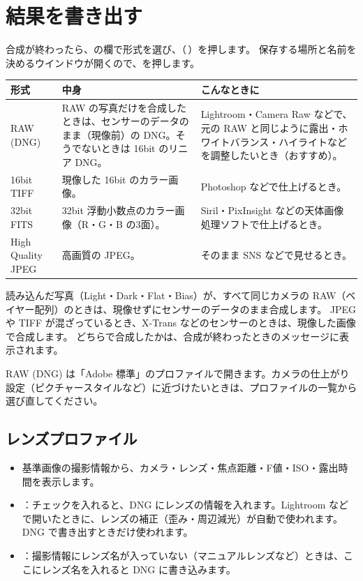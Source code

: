 \clearpage
\section{結果を書き出す}\label{sec:export}

合成が終わったら、の欄で形式を選び、（\,）を押します。
保存する場所と名前を決めるウインドウが開くので、を押します。

\begin{center}
\small
\begin{tabularx}{\linewidth}{l X X}
\toprule
形式 & 中身 & こんなときに \\
\midrule
RAW (DNG) & RAW の写真だけを合成したときは、センサーのデータのまま（現像前）の DNG。そうでないときは 16bit のリニア DNG。 & Lightroom・Camera Raw などで、元の RAW と同じように露出・ホワイトバランス・ハイライトなどを調整したいとき（おすすめ）。 \\
16bit TIFF & 現像した 16bit のカラー画像。 & Photoshop などで仕上げるとき。 \\
32bit FITS & 32bit 浮動小数点のカラー画像（R・G・B の3面）。 & Siril・PixInsight などの天体画像処理ソフトで仕上げるとき。 \\
High Quality JPEG & 高画質の JPEG。 & そのまま SNS などで見せるとき。 \\
\bottomrule
\end{tabularx}
\end{center}

\begin{memo}
読み込んだ写真（Light・Dark・Flat・Bias）が、すべて同じカメラの RAW（ベイヤー配列）のときは、現像せずにセンサーのデータのまま合成します。
JPEG や TIFF が混ざっているとき、X-Trans などのセンサーのときは、現像した画像で合成します。
どちらで合成したかは、合成が終わったときのメッセージに表示されます。
\end{memo}

\begin{hint}
RAW (DNG) は「Adobe 標準」のプロファイルで開きます。カメラの仕上がり設定（ピクチャースタイルなど）に近づけたいときは、プロファイルの一覧から選び直してください。
\end{hint}

\subsection{レンズプロファイル}

\begin{itemize}[itemsep=0.3ex]
  \item 基準画像の撮影情報から、カメラ・レンズ・焦点距離・F値・ISO・露出時間を表示します。
  \item {}：チェックを入れると、DNG にレンズの情報を入れます。Lightroom などで開いたときに、レンズの補正（歪み・周辺減光）が自動で使われます。DNG で書き出すときだけ使われます。
  \item {}：撮影情報にレンズ名が入っていない（マニュアルレンズなど）ときは、ここにレンズ名を入れると DNG に書き込みます。
\end{itemize}
